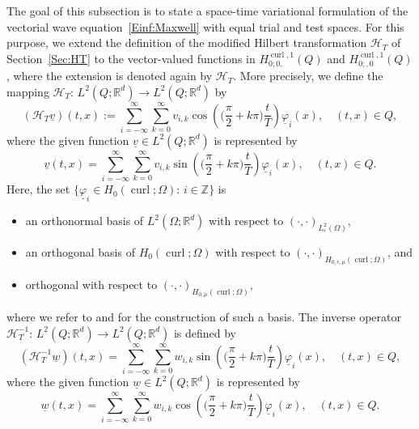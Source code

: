 \documentclass[a4paper,11pt]{article}
\newcommand{\Z}{\mathbb Z}
\newcommand{\R}{\mathbb R}
\newcommand{\cu}{\operatorname{curl}}
\renewcommand{\vec}[1]{\underline{#1}}
\begin{document}
The goal of this subsection is to state a space-time variational formulation of the vectorial wave equation~\eqref{Einf:Maxwell} with equal trial and test spaces. For this purpose, we extend the definition of the modified Hilbert transformation $\mathcal H_T$ of Section~\ref{Sec:HT} to the vector-valued functions in $ H^{\cu,1}_{0;0,}(Q)$ and $ H^{\cu,1}_{0;,0}(Q)$, where the extension is denoted again by $\mathcal H_T$. More precisely, we define the mapping $\mathcal H_T \colon \, L^2(Q; \R^d) \to L^2(Q; \R^d)$ by
\begin{equation} \label{VF:HT}
	({\mathcal{H}}_T \vec v)(t,x) :=  \sum_{i=-\infty}^\infty \sum_{k=0}^\infty v_{i,k} \cos \left( \Big( \frac{\pi}{2} + k\pi \Big) \frac{t}{T} \right) \vec \varphi_i(x), \quad (t,x) \in Q,
\end{equation}
where the given function $\vec v \in L^2(Q;\R^d)$ is represented by
\begin{equation} \label{VF:vFourier}
	\vec v(t,x) = \sum_{i=-\infty}^\infty \sum_{k=0}^\infty v_{i,k} \sin \left( \Big( \frac{\pi}{2} + k\pi \Big) \frac{t}{T} \right) \vec \varphi_i(x), \quad (t,x) \in Q.
\end{equation}
Here, the set $\{ \vec \varphi_i \in H_0(\cu;\Omega) : \, i \in \Z \}$ is
\begin{itemize}
  \item an orthonormal basis of $L^2(\Omega;\R^d)$ with respect to $(\cdot, \cdot)_{L^2_\epsilon(\Omega)}$,
  \item an orthogonal basis of $H_0(\cu;\Omega)$ with respect to $(\cdot, \cdot)_{H_{0,\epsilon,\mu}(\cu;\Omega)}$, and
  \item orthogonal with respect to $(\cdot, \cdot)_{H_{0,\mu}(\cu;\Omega)}$,
\end{itemize}
where we refer to \cite[Subsection~1.1.1]{HauserOhm2023} and \cite[Subsection~8.3.1.2]{Assous2018} for the construction of such a basis. The inverse operator $\mathcal H_T^{-1} \colon \, L^2(Q; \R^d) \to L^2(Q; \R^d)$ is defined by
\begin{equation*}
	({\mathcal{H}}_T^{-1} \vec w)(t,x) =  \sum_{i=-\infty}^\infty \sum_{k=0}^\infty w_{i,k} \sin \left( \Big( \frac{\pi}{2} + k\pi \Big) \frac{t}{T} \right) \vec \varphi_i(x), \quad (t,x) \in Q,
\end{equation*}
where the given function $\vec w \in L^2(Q;\R^d)$ is represented by
\begin{equation} \label{VF:wFourier}
	\vec w(t,x) = \sum_{i=-\infty}^\infty \sum_{k=0}^\infty w_{i,k} \cos \left( \Big( \frac{\pi}{2} + k\pi \Big) \frac{t}{T} \right) \vec \varphi_i(x), \quad (t,x) \in Q.
\end{equation}
\end{document}
